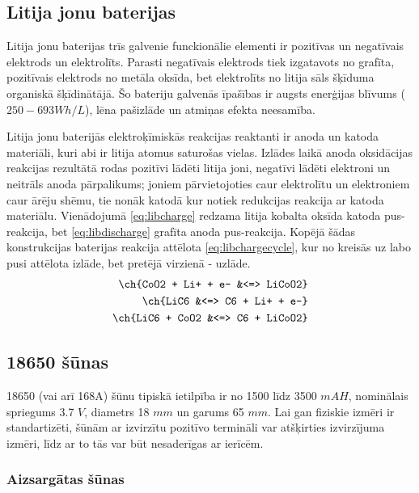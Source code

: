 \documentclass[12pt,fleqn,titlepage,oneside]{article}
\begin{document}
\subsection{Litija jonu baterijas}

Litija jonu baterijas trīs galvenie funckionālie elementi ir pozitīvas un negatīvais elektrods un elektrolīts. 
Parasti negatīvais elektrods tiek izgatavots no grafīta, pozitīvais elektrods no metāla oksīda, bet elektrolīts no litija sāls šķīduma organiskā šķīdinātājā.
Šo bateriju galvenās īpašības ir augsts enerģijas blīvums ($250-693Wh/L$), lēna pašizlāde un atmiņas efekta neesamība.

Litija jonu baterijās elektroķīmiskās reakcijas reaktanti ir anoda un katoda materiāli, kuri abi ir litija atomus saturošas vielas.
Izlādes laikā anoda oksidācijas reakcijas rezultātā rodas pozitīvi lādēti litija joni, negatīvi lādēti elektroni un neitrāls anoda pārpalikums;
joniem pārvietojoties caur elektrolītu un elektroniem caur ārēju shēmu, tie nonāk katodā kur notiek redukcijas reakcija ar katoda materiālu.
Vienādojumā \ref{eq:libcharge} redzama litija kobalta oksīda katoda pus-reakcija, bet \ref{eq:libdischarge} grafīta anoda pus-reakcija.
Kopējā šādas konstrukcijas baterijas reakcija attēlota \ref{eq:libchargecycle}, kur no kreisās uz labo pusi attēlota izlāde, bet pretējā virzienā - uzlāde.
\begin{align}
	\ch{CoO2 + Li+ + e- &<=> LiCoO2}		\label{eq:libcharge} \\
	\ch{LiC6 &<=> C6 + Li+ + e-}			\label{eq:libdischarge} \\
	\ch{LiC6 + CoO2 &<=> C6 + LiCoO2}	\label{eq:libchargecycle}
\end{align}



\subsection{18650 šūnas}

18650 (vai arī 168A) šūnu tipiskā ietilpība ir no 1500 līdz 3500 $mAH$, nominālais spriegums 3.7 $V$,
diametrs 18 $mm$ un garums 65 $mm$.\cite{18650cell}
Lai gan fiziskie izmēri ir standartizēti, šūnām ar izvirzītu pozitīvo termināli var atšķirties izvirzījuma izmēri,
līdz ar to tās var būt nesaderīgas ar ierīcēm.

\subsubsection{Aizsargātas šūnas}
\end{document}
